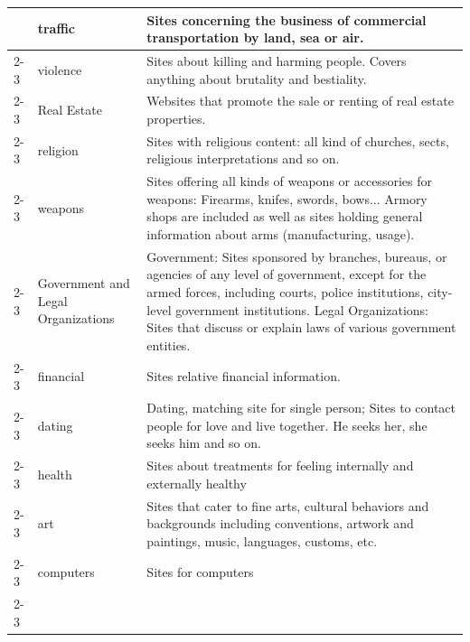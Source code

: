 \begin{longtable}{p{}|p{}|p{}}
                                                         & traffic & Sites concerning the business of commercial transportation by land, sea or air. \\ \cline{2-3}
                                                         & violence & Sites about killing and harming people. Covers anything about brutality and bestiality. \\ \cline{2-3}
                                                         & Real Estate & Websites that promote the sale or renting of real estate properties.\\ \cline{2-3}
                                                         & religion & Sites with religious content: all kind of churches, sects, religious interpretations and so on. \\ \cline{2-3}
                                                         & weapons & Sites offering all kinds of weapons or accessories for weapons: Firearms, knifes, swords, bows... Armory shops are included as well as sites holding general information about arms (manufacturing, usage).\\ \cline{2-3}
                                                         & Government and Legal Organizations & Government: Sites sponsored by branches, bureaus, or agencies of any level of government, except for the armed forces, including courts, police institutions, city-level government institutions. Legal Organizations: Sites that discuss or explain laws of various government entities.\\ \cline{2-3}
                                                         & financial & Sites relative financial information. \\ \cline{2-3}
                                                         & dating & Dating, matching site for single person; Sites to contact people for love and live together. He seeks her, she seeks him and so on.\\ \cline{2-3}
                                                         & health & Sites about treatments for feeling internally and externally healthy   \\ \cline{2-3}
                                                         & art & Sites that cater to fine arts, cultural behaviors and backgrounds including conventions, artwork and paintings, music, languages, customs, etc. \\ \cline{2-3}
                                                         & computers & Sites for computers \\ \cline{2-3}

\end{longtable}
